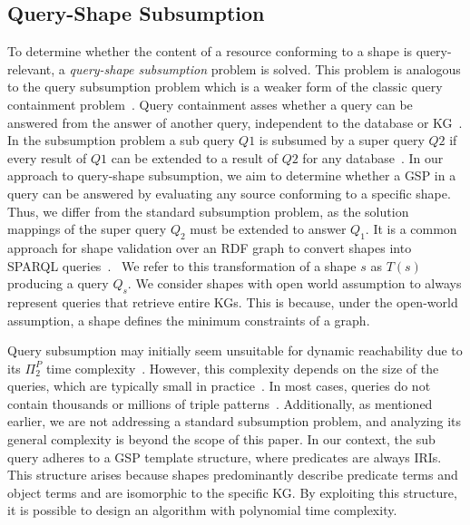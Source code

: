 \subsection{Query-Shape Subsumption}\label{sec:containment}
To determine whether the content of a resource conforming to a shape is query-relevant, a \emph{query-shape subsumption} problem is solved.  
This problem is analogous to the query subsumption problem which is a weaker form of the classic query containment problem~\cite{Spasi2023}.
Query containment asses whether a query can be answered from the answer of another query,  independent to the database or KG~\cite{afariQCE}.
In the subsumption problem a sub query $Q1$ is subsumed by a super query $Q2$  if every result of $Q1$ can be extended to a result of $Q2$ for any database~\cite{Spasi2023, Pichler2014}.
In our approach to query-shape subsumption, we aim to determine whether a GSP in a query can be answered by evaluating any source conforming to a specific shape.
Thus, we differ from the standard subsumption problem, as the solution mappings of the super query $Q_2$ must be extended to answer $Q_1$.
It is a common approach for shape validation over an RDF graph to convert shapes into SPARQL queries~\cite{labragayo2017validatingdescribinglinkeddata, Corman2019,Prestamo2023, spapeExpressionConvert}.~
We refer to this transformation of a shape $s$ as $T(s)$ producing a query $Q_s$.
We consider shapes with open world assumption to always represent queries that retrieve entire KGs.
This is because, under the open-world assumption, a shape defines the minimum constraints of a graph.

Query subsumption may initially seem unsuitable for dynamic reachability due to its $\Pi^P_2$ time complexity~\cite{Pichler2014, Letelier2013}.  
However, this complexity depends on the size of the queries, which are typically small in practice~\cite{Doan2012}.  
In most cases, queries do not contain thousands or millions of triple patterns~\cite{Bonifati2019}.  
Additionally, as mentioned earlier, we are not addressing a standard subsumption problem, and analyzing its general complexity is beyond the scope of this paper.
In our context, the sub query adheres to a GSP template structure, where predicates are always IRIs.
This structure arises because shapes predominantly describe predicate terms and object terms and are isomorphic to the specific KG.
By exploiting this structure, it is possible to design an algorithm with polynomial time complexity.

